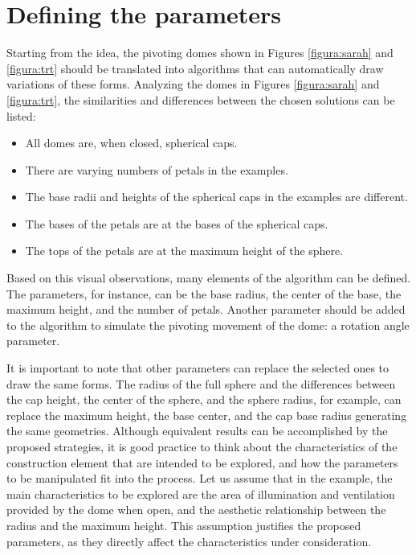 \documentclass[preprint,12pt,3p]{elsarticle}
\begin{document}
\section{Defining the parameters}
\label{implem}

Starting from the idea, the pivoting domes shown in Figures \ref{figura:sarah} and \ref{figura:trt} should be translated into algorithms that can automatically draw variations of these forms. Analyzing the domes in Figures \ref{figura:sarah} and \ref{figura:trt}, the similarities and differences between the chosen solutions can be listed:

\begin{itemize}
\item All domes are, when closed, spherical caps.
\item There are varying numbers of petals in the examples.
\item The base radii and heights of the spherical caps in the examples are different.
\item The bases of the petals are at the bases of the spherical caps.
\item The tops of the petals are at the maximum height of the sphere.
\end{itemize}

Based on this visual observations, many elements of the algorithm can be defined. The parameters, for instance, can be the base radius, the center of the base, the maximum height, and the number of petals. Another parameter should be added to the algorithm to simulate the pivoting movement of the dome: a rotation angle parameter.

It is important to note that other parameters can replace the selected ones to draw the same forms. The radius of the full sphere and the differences between the cap height, the center of the sphere, and the sphere radius, for example, can replace the maximum height, the base center, and the cap base radius generating the same geometries. Although equivalent results can be accomplished by the proposed strategies, it is good practice to think about the characteristics of the construction element that are intended to be explored, and how the parameters to be manipulated fit into the process. Let us assume that in the example, the main characteristics to be explored are the area of illumination and ventilation provided by the dome when open, and the aesthetic relationship between the radius and the maximum height. This assumption justifies the proposed parameters, as they directly affect the characteristics under consideration.
\end{document}
